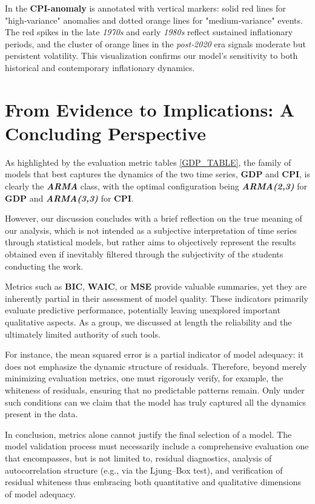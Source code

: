 \documentclass{Configuration_Files/PoliMi3i_thesis}
\begin{document}
In the \textbf{CPI-anomaly} is annotated with vertical markers: solid red lines for "high‐variance" anomalies and dotted orange lines for "medium‐variance" events. The red spikes in the late \textit{1970s} and early \textit{1980s} reflect sustained inflationary periods, and the cluster of orange lines in the \textit{post‐2020} era signals moderate but persistent volatility. This visualization confirms our model’s sensitivity to both historical and contemporary inflationary dynamics.

\chapter{From Evidence to Implications: A Concluding Perspective}
As highlighted by the evaluation metric tables \ref{GDP_TABLE}, the family of models that best captures the dynamics of the two time series, \textbf{GDP} and \textbf{CPI}, is clearly the \textbf{\textit{ARMA}} class, with the optimal configuration being \textbf{\textit{ARMA(2,3)}} for \textbf{GDP} and \textbf{\textit{ARMA(3,3)}} for \textbf{CPI}.

However, our discussion concludes with a brief reflection on the true meaning of our analysis, which is not intended as a subjective interpretation of time series through statistical models, but rather aims to objectively represent the results obtained even if inevitably filtered through the subjectivity of the students conducting the work.

Metrics such as \textbf{BIC}, \textbf{WAIC}, or \textbf{MSE} provide valuable summaries, yet they are inherently partial in their assessment of model quality. These indicators primarily evaluate predictive performance, potentially leaving unexplored important qualitative aspects. As a group, we discussed at length the reliability and the ultimately limited authority of such tools. 

For instance, the mean squared error is a partial indicator of model adequacy: it does not emphasize the dynamic structure of residuals. Therefore, beyond merely minimizing evaluation metrics, one must rigorously verify, for example, the whiteness of residuals, ensuring that no predictable patterns remain. Only under such conditions can we claim that the model has truly captured all the dynamics present in the data.

In conclusion, metrics alone cannot justify the final selection of a model. The model validation process must necessarily include a comprehensive evaluation one that encompasses, but is not limited to, residual diagnostics, analysis of autocorrelation structure (e.g., via the Ljung–Box test), and verification of residual whiteness thus embracing both quantitative and qualitative dimensions of model adequacy. 
\end{document}
